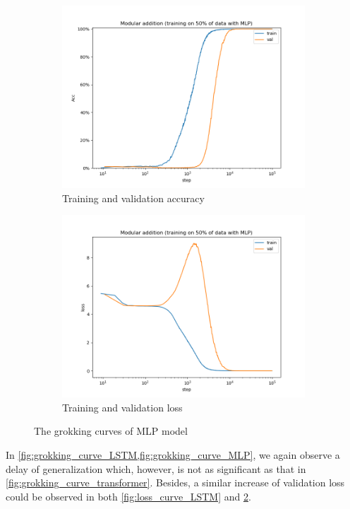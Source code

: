 \begin{figure}[!ht]
    \centering
    \begin{subfigure}{0.45\textwidth}
        \centering
        \includegraphics[width=\linewidth]{fig/grokking_curves/addition_50_MLP_step.png}
        \caption{Training and validation accuracy}
        \label{fig:grokking_curve_MLP}
    \end{subfigure}
    \begin{subfigure}{0.45\textwidth}
        \centering
        \includegraphics[width=\linewidth]{fig/loss_curves/addition_50_MLP_step.png}
        \caption{Training and validation loss}
        \label{fig:loss_curve_MLP}
    \end{subfigure}

    \caption{The grokking curves of MLP model}
    \label{fig:acc_and_loss_MLP}
\end{figure}

In \cref{fig:grokking_curve_LSTM,fig:grokking_curve_MLP}, we again observe a delay of generalization which, however, is not as significant as that in \cref{fig:grokking_curve_transformer}.
Besides, a similar increase of validation loss could be observed in both \cref{fig:loss_curve_LSTM} and \cref{fig:loss_curve_MLP}.